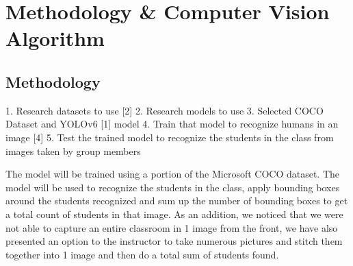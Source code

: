 \section{Methodology \& Computer Vision Algorithm}
\label{sec:method}
\subsection{Methodology}
\label{subsec:method}
1. Research datasets to use [2]
2. Research models to use 
3. Selected COCO Dataset and YOLOv6 [1] model
4. Train that model to recognize humans in an image [4]
5. Test the trained model to recognize the students in the class from images taken by group members

The model will be trained using a portion of the Microsoft COCO dataset. The model will be used to recognize the students in the class, apply bounding boxes around the students recognized and sum up the number of bounding boxes to get a total count of students in that image. As an addition, we noticed that we were not able to capture an entire classroom in 1 image from the front, we have also presented an option to the instructor to take numerous pictures and stitch them together into 1 image and then do a total sum of students found.\\ 

